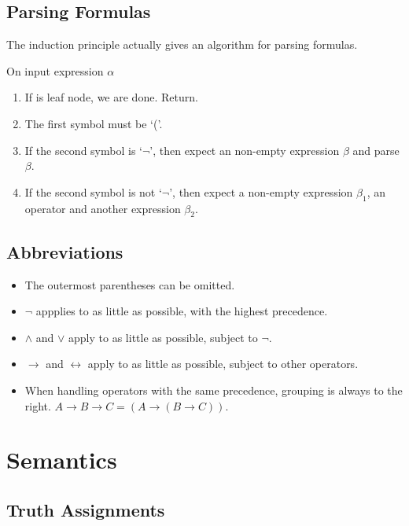 \subsection{Parsing Formulas}
\label{sub:ParsingFormulas}

The induction principle actually gives an algorithm for parsing formulas.

On input expression $\alpha$

\begin{enumerate}
    \item If is leaf node, we are done. Return.
    \item The first symbol must be `('.
    \item If the second symbol is `$\neg$', then expect an non-empty expression $\beta$ and parse $\beta$.
    \item If the second symbol is not `$\neg$', then expect a non-empty expression $\beta_1$, an operator and another expression $\beta_2$.
\end{enumerate}

\subsection{Abbreviations}
\label{sub:Abbreviations}

\begin{itemize}
    \item The outermost parentheses can be omitted.
    \item $\neg$ appplies to as little as possible, with the highest precedence.
    \item $\wedge$ and $\vee$ apply to as little as possible, subject to $\neg$.
    \item $\rightarrow$ and $\leftrightarrow$ apply to as little as possible, subject to other operators.
    \item When handling operators with the same precedence, grouping is always to the right. $A \rightarrow B \rightarrow C= (A \rightarrow (B\rightarrow C))$.
\end{itemize}

\section{Semantics}
\label{sec:Semantics}

\subsection{Truth Assignments}


